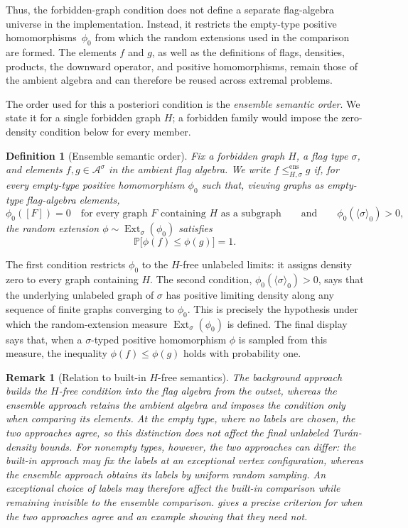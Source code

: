 \documentclass{article}
\newtheorem{definition}[definition]{Definition}
\newtheorem{remark}[remark]{Remark}
\newcommand{\Ext}{\operatorname{Ext}}
\begin{document}
Thus, the forbidden-graph condition does not define a separate flag-algebra
universe in the implementation.  Instead, it restricts the empty-type positive
homomorphisms~\(\phi_0\) from which the random extensions used in the comparison
are formed.  The elements \(f\) and \(g\), as well as the definitions of flags,
densities, products, the downward operator, and positive homomorphisms, remain
those of the ambient algebra and can therefore be reused across extremal
problems.

The order used for this a posteriori condition is the
\emph{ensemble semantic order}.  We state it for a single forbidden graph
\(H\); a forbidden family would impose the zero-density condition below for
every member.

\begin{definition}[Ensemble semantic order]\label{def:ensemble-semantic-order}
Fix a forbidden graph \(H\), a flag type \(\sigma\), and elements
\(f,g\in\mathcal{A}^\sigma\) in the ambient flag algebra.  We write
\(f\leq^{\mathrm{ens}}_{H,\sigma} g\) if, for every empty-type positive
homomorphism \(\phi_0\) such that, viewing graphs as
empty-type flag-algebra elements,
\[
  \phi_0([F])=0
  \quad\text{for every graph \(F\) containing \(H\) as a subgraph}
  \qquad\text{and}\qquad
  \phi_0(\langle\sigma\rangle_0)>0,
\]
the random extension \(\phi\sim\Ext_\sigma(\phi_0)\) satisfies
\[
  \mathbb{P}\bigl[\phi(f)\leq\phi(g)\bigr]=1.
\]
\end{definition}

The first condition restricts \(\phi_0\) to the \(H\)-free unlabeled limits: it
assigns density zero to every graph containing \(H\).  The second condition,
\(\phi_0(\langle\sigma\rangle_0)>0\), says that the underlying unlabeled graph of
\(\sigma\) has positive limiting density along any sequence of finite
graphs converging to \(\phi_0\).  This is precisely the hypothesis under which the random-extension
measure \(\Ext_\sigma(\phi_0)\) is defined.  The final display says that, when a
\(\sigma\)-typed positive homomorphism \(\phi\) is sampled from this measure, the
inequality \(\phi(f)\leq\phi(g)\) holds with probability one.

\begin{remark}[Relation to built-in \(H\)-free semantics]\label{rem:builtin-hfree}
The background approach builds the \(H\)-free condition into the flag algebra
from the outset, whereas the ensemble approach retains the ambient algebra and
imposes the condition only when comparing its elements.  At the empty type,
where no labels are chosen, the two approaches agree, so this distinction does
not affect the final unlabeled Tur\'an-density bounds.  For nonempty types,
however, the two approaches can differ: the built-in approach may fix the
labels at an exceptional vertex configuration, whereas the ensemble approach
obtains its labels by uniform random sampling.  An exceptional choice of labels
may therefore affect the built-in comparison while remaining invisible to the
ensemble comparison.
 gives a precise criterion for when the two approaches
agree and an example showing that they need not.
\end{remark}
\end{document}
